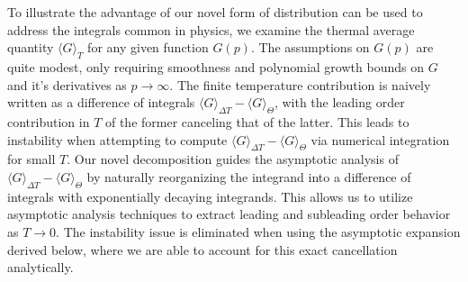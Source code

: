 \documentclass[sn-mathphys,Numbered]{sn-jnl}
\newcommand*{\xgreen}{\color{green}}
\begin{document}
To illustrate the advantage of our novel form of distribution can be used to address the integrals common in physics, we examine the thermal average quantity $\langle G\rangle_T$ for any given function $G(p)$. The assumptions on $G(p)$ are quite modest, only requiring smoothness and polynomial growth bounds on $G$ and it's derivatives as $p\to \infty$. The finite temperature contribution is naively written as a difference of integrals $\langle G\rangle_{\Delta T}-\langle G\rangle_\Theta$, with the leading order contribution in $T$ of the former canceling that of the latter.  This leads to instability when attempting to compute $\langle G\rangle_{\Delta T}-\langle G\rangle_\Theta$ via numerical integration for small $T$.  
Our novel decomposition guides the asymptotic analysis of $\langle G\rangle_{\Delta T}-\langle G\rangle_\Theta$ by naturally reorganizing the integrand into a difference of integrals with exponentially decaying integrands. This allows us to utilize asymptotic analysis techniques to   extract  leading and subleading order behavior as $T\to 0$.  The instability issue is eliminated when using the asymptotic expansion derived below, where we are able to account for this exact cancellation analytically. 



 


\end{document}
